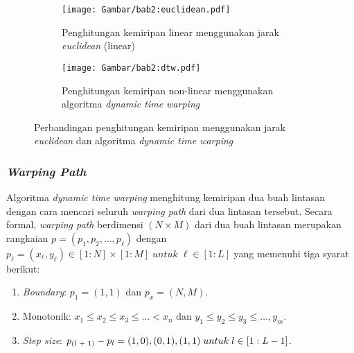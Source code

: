 \documentclass[a4paper,twoside]{article}
\begin{document}
\begin{figure}[t]
    \centering
    \begin{subfigure}[h]{0.45\textwidth}
        \centering
        \texttt{[image: Gambar/bab2:euclidean.pdf]}
        \caption{Penghitungan kemiripan linear menggunakan jarak \textit{euclidean} (linear)}
        \label{bab2:euclidean}
    \end{subfigure} \hspace{10pt}
    \begin{subfigure}[h]{0.45\textwidth}
        \centering
        \texttt{[image: Gambar/bab2:dtw.pdf]}
        \caption{Penghitungan kemiripan non-linear menggunakan algoritma \textit{dynamic time warping}}
        \label{bab2:dtw}
    \end{subfigure}
    \caption{Perbandingan penghitungan kemiripan menggunakan jarak \textit{euclidean} dan algoritma \textit{dynamic time warping}}
    \label{bab2:dtw-euclidean}
\end{figure}

\subsubsection{\textit{Warping Path}}

Algoritma \textit{dynamic time warping} menghitung kemiripan dua buah lintasan dengan cara mencari seluruh \textit{warping path} dari dua lintasan tersebut. Secara formal, \textit{warping path} berdimensi $(N \times M)$ dari dua buah lintasan merupakan rangkaian $p = (p_1, p_2, \ldots, p_\ell)$ dengan $p_\ell = (x_\ell, y_\ell) \in [1 : N] \times [1 : M]\;untuk\;\ell \in [1 : L]$ yang memenuhi tiga syarat berikut:

\begin{enumerate}
    \item \textit{Boundary}: $p_1 = (1, 1)$ dan $p_x = (N, M)$.
    \item Monotonik: $x_1 \leq x_2 \leq x_3 \leq \ldots < x_n$ dan $y_1 \leq y_2 \leq y_3 \leq \ldots, y_m$.
    \item \textit{Step size}: $p\textsubscript{(l + 1)} - p_l = {(1, 0), (0, 1), (1, 1)}\;untuk\; l \in [1 : L - 1]$.
\end{enumerate}
\end{document}
